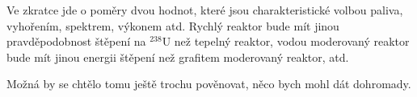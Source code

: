 Ve zkratce jde o poměry dvou hodnot, které jsou charakteristické volbou paliva, vyhořením, spektrem, výkonem atd. Rychlý reaktor bude mít jinou pravděpodobnost štěpení na $^{238}$U než tepelný reaktor, vodou moderovaný reaktor bude mít jinou energii štěpení než grafitem moderovaný reaktor, atd.

Možná by se chtělo tomu ještě trochu pověnovat, něco bych mohl dát dohromady.